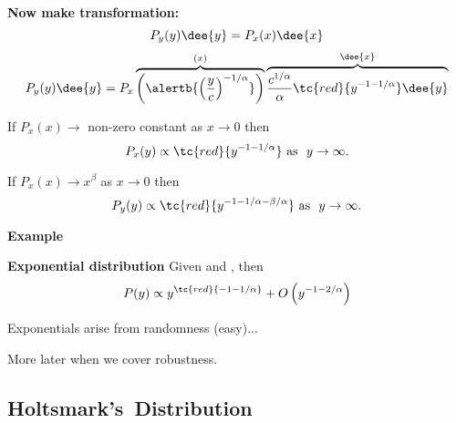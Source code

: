   



  \textbf{Now make transformation:}  
      $$
      P_y(y) \dee{y}
      = P_x(x) \dee{x}
      $$
      {$$
      P_y(y) \dee{y}
      = P_x
      \overbrace{
      \left(
        \alertb{
          \left(
            \frac{y}{c}
          \right)^{-1/\alpha}}
      \right)
        }^{(x)}
      \overbrace{
      \frac{c^{1/\alpha}}{\alpha}
      \tc{red}{y^{-1 - 1/\alpha}} \dee{y}}^{\dee{x}}
      $$}

      \bigskip

      
        
        If $P_x(x) \rightarrow$ non-zero constant
        as $x \rightarrow 0$ then
        $$
        P_x(y) 
        \propto 
        \tc{red}{y^{-1 -1/\alpha}} 
        \mbox{\ as \ } 
        y \rightarrow \infty. 
        $$
      
        If $P_x(x) \rightarrow x^{\beta}$ as $x \rightarrow 0$ then
        $$ 
        P_y(y) 
        \propto 
        \tc{red}{y^{-1 -1/\alpha - \beta/\alpha}} 
        \mbox{\ as \ } 
        y \rightarrow \infty.
        $$
      
  


  \textbf{Example}

  \textbf{Exponential distribution}
    Given  
    and , then
    $$ P(y) \propto y^{\tc{red}{-1-1/\alpha}} + O\left(y^{-1-2/\alpha}\right)$$
    
    
      Exponentials arise from randomness (easy)...
    
      More later when we cover robustness.
    
  



% 
% 
% 

\subsection{Holtsmark's\ Distribution}

